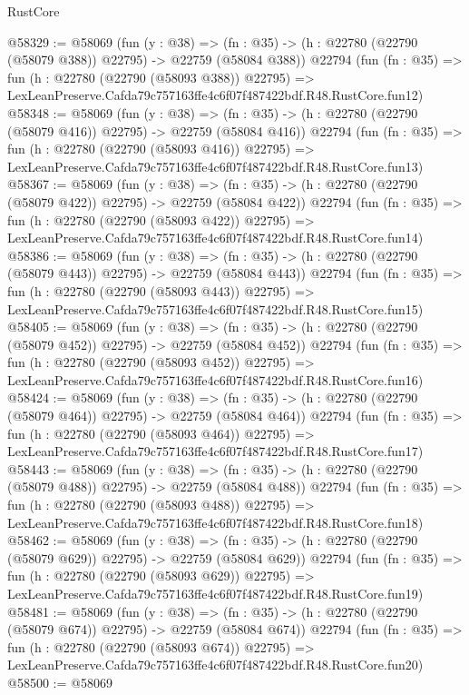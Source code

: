 \begin{lexlean}{RustCore}
\begin{coremodule}
@58329 := @58069
    (fun (y : @38) =>
    (fn : @35) -> (h : @22780 (@22790 (@58079 @388)) @22795) -> @22759 (@58084 @388))
    @22794
    (fun (fn : @35) =>
    fun (h : @22780 (@22790 (@58093 @388)) @22795) =>
    LexLeanPreserve.Cafda79c757163ffe4c6f07f487422bdf.R48.RustCore.fun12)
@58348 := @58069
    (fun (y : @38) =>
    (fn : @35) -> (h : @22780 (@22790 (@58079 @416)) @22795) -> @22759 (@58084 @416))
    @22794
    (fun (fn : @35) =>
    fun (h : @22780 (@22790 (@58093 @416)) @22795) =>
    LexLeanPreserve.Cafda79c757163ffe4c6f07f487422bdf.R48.RustCore.fun13)
@58367 := @58069
    (fun (y : @38) =>
    (fn : @35) -> (h : @22780 (@22790 (@58079 @422)) @22795) -> @22759 (@58084 @422))
    @22794
    (fun (fn : @35) =>
    fun (h : @22780 (@22790 (@58093 @422)) @22795) =>
    LexLeanPreserve.Cafda79c757163ffe4c6f07f487422bdf.R48.RustCore.fun14)
@58386 := @58069
    (fun (y : @38) =>
    (fn : @35) -> (h : @22780 (@22790 (@58079 @443)) @22795) -> @22759 (@58084 @443))
    @22794
    (fun (fn : @35) =>
    fun (h : @22780 (@22790 (@58093 @443)) @22795) =>
    LexLeanPreserve.Cafda79c757163ffe4c6f07f487422bdf.R48.RustCore.fun15)
@58405 := @58069
    (fun (y : @38) =>
    (fn : @35) -> (h : @22780 (@22790 (@58079 @452)) @22795) -> @22759 (@58084 @452))
    @22794
    (fun (fn : @35) =>
    fun (h : @22780 (@22790 (@58093 @452)) @22795) =>
    LexLeanPreserve.Cafda79c757163ffe4c6f07f487422bdf.R48.RustCore.fun16)
@58424 := @58069
    (fun (y : @38) =>
    (fn : @35) -> (h : @22780 (@22790 (@58079 @464)) @22795) -> @22759 (@58084 @464))
    @22794
    (fun (fn : @35) =>
    fun (h : @22780 (@22790 (@58093 @464)) @22795) =>
    LexLeanPreserve.Cafda79c757163ffe4c6f07f487422bdf.R48.RustCore.fun17)
@58443 := @58069
    (fun (y : @38) =>
    (fn : @35) -> (h : @22780 (@22790 (@58079 @488)) @22795) -> @22759 (@58084 @488))
    @22794
    (fun (fn : @35) =>
    fun (h : @22780 (@22790 (@58093 @488)) @22795) =>
    LexLeanPreserve.Cafda79c757163ffe4c6f07f487422bdf.R48.RustCore.fun18)
@58462 := @58069
    (fun (y : @38) =>
    (fn : @35) -> (h : @22780 (@22790 (@58079 @629)) @22795) -> @22759 (@58084 @629))
    @22794
    (fun (fn : @35) =>
    fun (h : @22780 (@22790 (@58093 @629)) @22795) =>
    LexLeanPreserve.Cafda79c757163ffe4c6f07f487422bdf.R48.RustCore.fun19)
@58481 := @58069
    (fun (y : @38) =>
    (fn : @35) -> (h : @22780 (@22790 (@58079 @674)) @22795) -> @22759 (@58084 @674))
    @22794
    (fun (fn : @35) =>
    fun (h : @22780 (@22790 (@58093 @674)) @22795) =>
    LexLeanPreserve.Cafda79c757163ffe4c6f07f487422bdf.R48.RustCore.fun20)
@58500 := @58069

\end{coremodule}
\end{lexlean}

